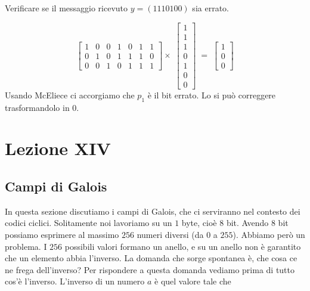 \documentclass[12pt]{report}
\begin{document}
    \begin{es}
        Verificare se il messaggio ricevuto $y = (1110100)$ sia errato.

        \[
            \begin{bmatrix}
                1 & 0 & 0 & 1 & 0 & 1 & 1\\
                0 & 1 & 0 & 1 & 1 & 1 & 0\\
                0 & 0 & 1 & 0 & 1 & 1 & 1
            \end{bmatrix}
            \times
            \; \begin{bmatrix}
                   1 \\
                   1 \\
                   1 \\
                   0 \\
                   1 \\
                   0 \\
                   0
            \end{bmatrix} \; = \; \begin{bmatrix}
                                      1 \\
                                      0 \\
                                      0
            \end{bmatrix} \]
        Usando McEliece ci accorgiamo che $p_1$ è il bit errato. Lo si può correggere trasformandolo in $0$.
    \end{es}

    \chapter{Lezione XIV}


    \section{Campi di Galois}

    In questa sezione discutiamo i campi di Galois, che ci serviranno nel contesto dei codici ciclici. Solitamente noi lavoriamo su un $1$ byte, cioè $8$ bit. Avendo $8$ bit possiamo esprimere al massimo $256$ numeri diversi (da $0$ a $255$). Abbiamo però un problema. I $256$ possibili valori formano un anello, e su un anello non è garantito che un elemento abbia l'inverso. La domanda che sorge spontanea è, che cosa ce ne frega dell'inverso? Per rispondere a questa domanda vediamo prima di tutto cos'è l'inverso. L'inverso di un numero $a$ è quel valore tale che
\end{document}
